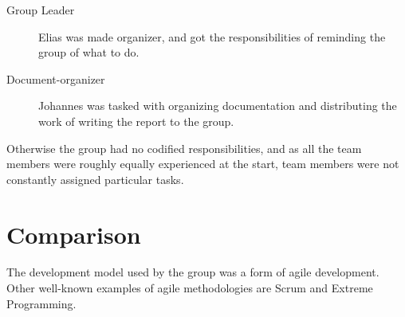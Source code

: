 \begin{description}

\item[Group Leader] Elias was made organizer, and got the responsibilities of reminding the group of what to do.
\item[Document-organizer] Johannes was tasked with organizing documentation and distributing the work of writing the report to the group. 
\end{description}
 
 Otherwise the group had no codified responsibilities, and as all the team members were roughly equally experienced at the start, team members were not constantly assigned particular tasks.

\section{Comparison}
The development model used by the group was a form of agile development. Other well-known examples of agile methodologies are Scrum and Extreme Programming.
 

